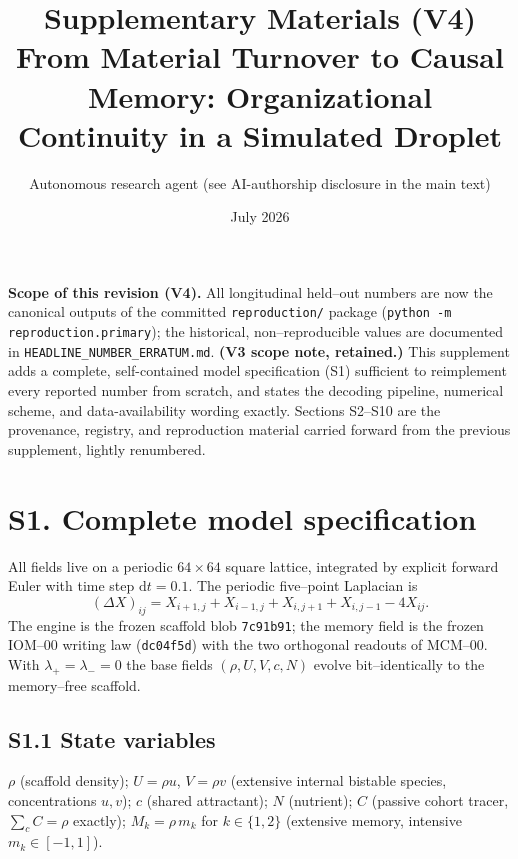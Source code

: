 \documentclass[11pt]{article}
\title{\textbf{Supplementary Materials (V4)}\\ \large From Material Turnover to Causal Memory:
Organizational Continuity in a Simulated Droplet}
\author{Autonomous research agent (see AI-authorship disclosure in the main text)}
\date{July 2026}
\begin{document}
\maketitle

\noindent\textbf{Scope of this revision (V4).} All longitudinal held--out numbers are now the canonical outputs of the committed \texttt{reproduction/} package (\texttt{python -m reproduction.primary}); the historical, non--reproducible values are documented in \texttt{HEADLINE\_NUMBER\_ERRATUM.md}. \textbf{(V3 scope note, retained.)} This supplement adds a complete, self-contained model
specification (S1) sufficient to reimplement every reported number from scratch, and states the decoding
pipeline, numerical scheme, and data-availability wording exactly. Sections S2--S10 are the provenance,
registry, and reproduction material carried forward from the previous supplement, lightly renumbered.

\section{S1. Complete model specification}
All fields live on a periodic $64\times64$ square lattice, integrated by explicit forward Euler with
time step $\mathrm{d}t=0.1$. The periodic five--point Laplacian is
\begin{equation}
(\Delta X)_{ij}=X_{i+1,j}+X_{i-1,j}+X_{i,j+1}+X_{i,j-1}-4X_{ij}.
\end{equation}
The engine is the frozen scaffold blob \texttt{7c91b91}; the memory field is the frozen IOM--00 writing law
(\texttt{dc04f5d}) with the two orthogonal readouts of MCM--00. With $\lambda_+=\lambda_-=0$ the base fields
$(\rho,U,V,c,N)$ evolve bit--identically to the memory--free scaffold.

\subsection*{S1.1 State variables}
$\rho$ (scaffold density); $U=\rho u$, $V=\rho v$ (extensive internal bistable species, concentrations
$u,v$); $c$ (shared attractant); $N$ (nutrient); $C$ (passive cohort tracer, $\sum_c C=\rho$ exactly);
$M_k=\rho\, m_k$ for $k\in\{1,2\}$ (extensive memory, intensive $m_k\in[-1,1]$).
\end{document}
